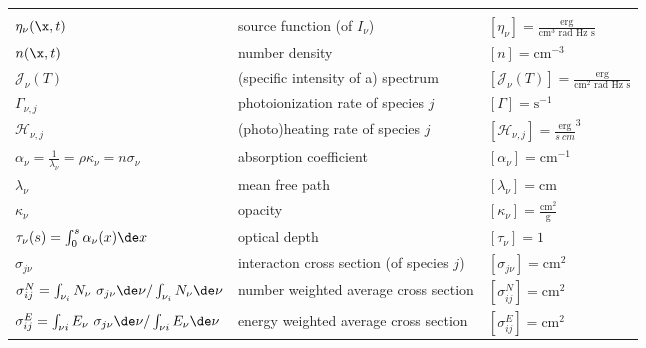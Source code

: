 \begin{center}
\begin{small}
\begin{tabular}{p{} p{} p{}}
\\
\hline\\


$\eta_\nu(\x, t)$ &
        source function (of $I_\nu$)&
        $[ \eta_\nu ] = \frac{\text{erg}}{\text{cm}^3 \text{ rad Hz s}}$
\\[.5em]
$n(\x, t)$ &
        number density &
        $[ n ] = \text{cm}^{-3}$
\\[.5em]
$\mathcal{J}_\nu(T)$ &
        (specific intensity of a) spectrum &
        $[\mathcal{J}_\nu (T)] = \frac{\text{erg}}{\text{cm}^2 \text{ rad Hz s}}$
\\[.5em]
$\Gamma_{\nu, j}$ &
        photoionization rate of species $j$ &
        $[\Gamma] = \text{s}^{-1}$
\\[.5em]
$\mathcal{H}_{\nu,j}$ &
        (photo)heating rate of species $j$ &
        $[\mathcal{H}_{\nu,j}] = \frac{\text{erg}}{s\ cm}^{3}$
\\[.5em]
$\alpha_\nu = \frac{1}{\lambda_\nu} = \rho \kappa_\nu = n \sigma_\nu$ &
        absorption coefficient &
        $[\alpha_\nu] = \text{cm}^{-1}$
\\[.5em]
$\lambda_\nu $ &
        mean free path &
        $[\lambda_\nu] = \text{cm}$
\\[.5em]
$\kappa_\nu $ &
        opacity &
        $[\kappa_\nu] = \frac{\text{cm}^2}{\text{g}}$
\\[.5em]
$\tau_\nu(s) = \int_0^s \alpha_\nu(x) \de x$ &
        optical depth &
        $[\tau_\nu] = 1$
\\[.5em]
$\sigma_{j\nu}$ &
        interacton cross section (of species $j$)&
        $[\sigma_{j\nu}] = \text{cm}^2$
\\[.5em]
$\sigma_{ij}^N = \int_{\nu_{i}} N_\nu \ \sigma_{j\nu} \de \nu / \int_{\nu_i} N_\nu \de \nu$ &
        number weighted average cross section &
        $[\sigma_{ij}^N] = \text{cm}^2$
\\[.5em]
$\sigma_{ij}^E = \int_{\nu i} E_\nu \ \sigma_{j\nu} \de \nu / \int_{\nu i} E_\nu \de \nu$ &
        energy weighted average cross section &
        $[\sigma_{ij}^E] = \text{cm}^2$
%

\end{tabular}
\end{small}
\end{center}

